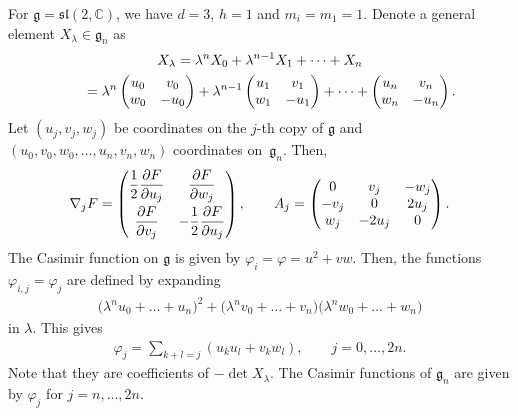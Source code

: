 \documentclass[10pt,a4paper]{amsart}
\numberwithin{equation}{section}
\begin{document}
\begin{Example}\label{example2.2}
For $\mathfrak{g} = \mathfrak{sl} (2, \mathbb{C})$, we have $d=3$, $h=1$ and $m_i = m_1 = 1$. Denote a general element $X_\lambda \in \mathfrak{g}_n$ as
\begin{gather*}
X_\lambda = \lambda ^nX_0 + \lambda ^{n-1} X_1 + \dots +X_n \\
\hphantom{X_\lambda}{} = \lambda ^n \left(
\begin{matrix}
u_0 & v_0 \\
w_0 & -u_0
\end{matrix}
\right) + \lambda ^{n-1}\left(
\begin{matrix}
u_1 & v_1 \\
w_1 & -u_1
\end{matrix}
\right) + \dots + \left(
\begin{matrix}
u_n & v_n \\
w_n & -u_n
\end{matrix}
\right).
\end{gather*}
Let $(u_j, v_j, w_j)$ be coordinates on the $j$-th copy of $\mathfrak{g}$ and $(u_0,v_0,w_0, \dots ,u_n,v_n,w_n)$ coordinates on~$\mathfrak{g}_n$. Then,
\begin{gather*}
\nabla _j F = \left(
\begin{matrix}
\displaystyle \frac{1}{2}\frac{\partial F}{\partial u_j} & \displaystyle \frac{\partial F}{\partial w_j} \vspace{1mm}\\
\displaystyle \frac{\partial F}{\partial v_j} & \displaystyle -\frac{1}{2}\frac{\partial F}{\partial u_j}
\end{matrix}
\right), \qquad A_j = \left(
\begin{matrix}
0 & v_j & -w_j \\
-v_j & 0 & 2u_j \\
w_j & -2u_j & 0
\end{matrix}
\right).
\end{gather*}
The Casimir function on $\mathfrak{g}$ is given by $\varphi _i = \varphi = u^2 + vw$. Then, the functions $\varphi _{i,j} = \varphi _j$ are def\/ined by expanding
\begin{gather*}
\big(\lambda ^n u_0 + \dots + u_n\big)^2 + \big(\lambda ^n v_0 + \dots + v_n\big)\big(\lambda ^n w_0 + \dots + w_n\big)
\end{gather*}
in $\lambda $. This gives
\begin{gather*}
\varphi _j = \sum_{k+l = j} \left( u_ku_l + v_k w_l \right), \qquad j=0,\dots ,2n.
\end{gather*}
Note that they are coef\/f\/icients of $-\det X_\lambda $. The Casimir functions of $\mathfrak{g}_n$ are given by $\varphi _j$ for $j=n,\dots ,2n$.
\end{Example}
\end{document}
